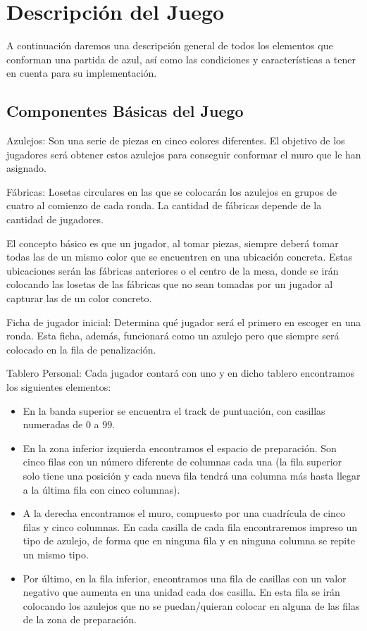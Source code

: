 \documentclass[a4paper,10pt,twocolumn]{article}
\begin{document}
\section{Descripción del Juego}

  A continuación daremos una descripción general de todos los elementos que conforman una partida de azul, así como las condiciones y características a tener en cuenta para su implementación.

  \subsection{Componentes Básicas del Juego}

  Azulejos: Son una serie de piezas en cinco colores diferentes. El objetivo de los jugadores será obtener estos azulejos para conseguir conformar el muro que le han asignado.
  
  Fábricas: Losetas circulares en las que se colocarán los azulejos en grupos de cuatro al comienzo de cada ronda. La cantidad de fábricas depende de la cantidad de jugadores.
  
  El concepto básico es que un jugador, al tomar piezas, siempre deberá tomar todas las de un mismo color que se encuentren en una ubicación concreta. Estas ubicaciones serán las fábricas anteriores o el centro de la mesa, donde se irán colocando las losetas de las fábricas que no sean tomadas por un jugador al capturar las de un color concreto.
  
  Ficha de jugador inicial: Determina qué jugador será el primero en escoger en una ronda. Esta ficha, además, funcionará como un azulejo pero que siempre será colocado en la fila de penalización.
  
  Tablero Personal: Cada jugador contará con uno y en dicho tablero encontramos los siguientes elementos:
  
  \begin{itemize}
  	\item En la banda superior se encuentra el track de puntuación, con casillas numeradas de 0 a 99.
  	\item En la zona inferior izquierda encontramos el espacio de preparación. Son cinco filas con un número diferente de columnas cada una (la fila superior solo tiene una posición y cada nueva fila tendrá una columna más hasta llegar a la última fila con cinco columnas).
  	\item A la derecha encontramos el muro, compuesto por una cuadrícula de cinco filas y cinco columnas. En cada casilla de cada fila encontraremos impreso un tipo de azulejo, de forma que en ninguna fila y en ninguna columna se repite un mismo tipo.
  	\item Por último, en la fila inferior, encontramos una fila de casillas con un valor negativo que aumenta en una unidad cada dos casilla. En esta fila se irán colocando los azulejos que no se puedan/quieran colocar en alguna de las filas de la zona de preparación.
  \end{itemize}
\end{document}
